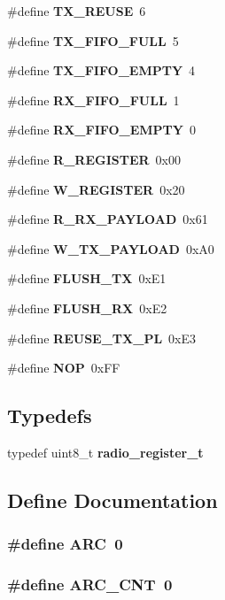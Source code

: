 \begin{CompactItemize}
\#define {\bf TX\_\-REUSE}~6
\item 
\#define {\bf TX\_\-FIFO\_\-FULL}~5
\item 
\#define {\bf TX\_\-FIFO\_\-EMPTY}~4
\item 
\#define {\bf RX\_\-FIFO\_\-FULL}~1
\item 
\#define {\bf RX\_\-FIFO\_\-EMPTY}~0
\item 
\#define {\bf R\_\-REGISTER}~0x00
\item 
\#define {\bf W\_\-REGISTER}~0x20
\item 
\#define {\bf R\_\-RX\_\-PAYLOAD}~0x61
\item 
\#define {\bf W\_\-TX\_\-PAYLOAD}~0x\-A0
\item 
\#define {\bf FLUSH\_\-TX}~0x\-E1
\item 
\#define {\bf FLUSH\_\-RX}~0x\-E2
\item 
\#define {\bf REUSE\_\-TX\_\-PL}~0x\-E3
\item 
\#define {\bf NOP}~0x\-FF
\end{CompactItemize}
\subsection*{Typedefs}
\begin{CompactItemize}
\item 
typedef uint8\_\-t {\bf radio\_\-register\_\-t}
\end{CompactItemize}


\subsection{Define Documentation}
\subsubsection{\setlength{\rightskip}{0pt plus 5cm}\#define ARC~0}\label{n_r_f24_l01_8h_14727f92df7a9466f732141f23b9c252}


\subsubsection{\setlength{\rightskip}{0pt plus 5cm}\#define ARC\_\-CNT~0}\label{n_r_f24_l01_8h_aae5ef9927daf8a4939cd2ed6ffff2ec}


